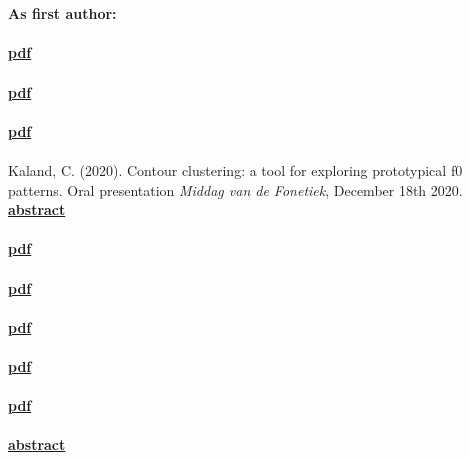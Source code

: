 \documentclass[a4paper,11pt]{article}
\begin{document}
\newpage
\section*{}
\textbf{As first author:}\\\\
 \textcolor{red}{\textbf{\lbrack\href{https://www.isca-speech.org/archive/pdfs/interspeech_2022/kaland22_interspeech.pdf}{pdf}\rbrack}}\\\\
 \textcolor{red}{\textbf{\lbrack\href{https://www.isca-speech.org/archive/pdfs/tai_2021/kaland21_tai.pdf}{pdf}\rbrack}}\\\\
 \textcolor{red}{\textbf{\lbrack\href{https://www.isca-speech.org/archive/pdfs/interspeech_2021/kaland21_interspeech.pdf}{pdf}\rbrack}}\\\\
Kaland, C. (2020). Contour clustering: a tool for exploring prototypical f0 patterns. Oral presentation \textit{Middag van de Fonetiek}, December 18th 2020. \textcolor{red}{\textbf{\lbrack\href{https://www.nvfw.org/sites/nvfw.org/files/Abstract_MvdF2020_Kaland.pdf}{abstract}\rbrack}}\\\\
 \textcolor{red}{\textbf{\lbrack\href{https://www.isca-speech.org/archive/SpeechProsody_2020/pdfs/25.pdf}{pdf}\rbrack}}\\\\
 \textcolor{red}{\textbf{\lbrack\href{https://www.isca-speech.org/archive/SpeechProsody_2020/pdfs/24.pdf}{pdf}\rbrack}}\\\\
 \textcolor{red}{\textbf{\lbrack\href{http://intro2psycholing.net/ICPhS/papers/ICPhS_1361.pdf}{pdf}\rbrack}}\\\\
 \textcolor{red}{\textbf{\lbrack\href{http://intro2psycholing.net/ICPhS/papers/ICPhS_2920.pdf}{pdf}\rbrack}}\\\\
 \textcolor{red}{\textbf{\lbrack\href{https://www.isca-speech.org/archive/SpeechProsody_2018/pdfs/13.pdf}{pdf}\rbrack}}\\\\
 \textcolor{red}{\textbf{\lbrack\href{https://typo3.univie.ac.at/fileadmin/user_upload/p_exapp2016/EXAPP-Abstracts/Kaland_Production.PDF}{abstract}\rbrack}}\\\\
\end{document}
